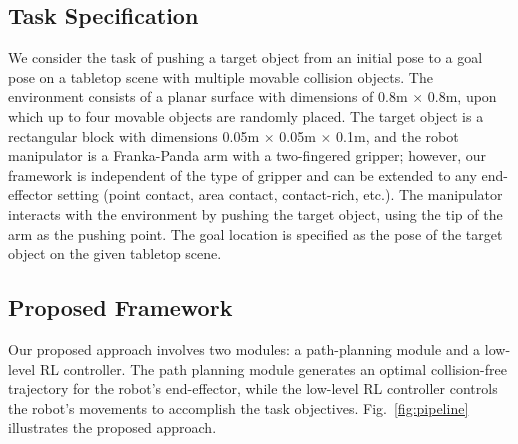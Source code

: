 \subsection{Task Specification}
\label{sec:task-specification}

We consider the task of pushing a target object from an initial pose to a goal pose on a tabletop scene with multiple movable collision objects. The environment consists of a planar surface with dimensions of 0.8m $\times$ 0.8m, upon which up to four movable objects are randomly placed. The target object is a rectangular block with dimensions 0.05m $\times$ 0.05m $\times$ 0.1m, and the robot manipulator is a Franka-Panda arm with a two-fingered gripper; however, our framework is independent of the type of gripper and can be extended to any end-effector setting (point contact, area contact, contact-rich, etc.). The manipulator interacts with the environment by pushing the target object, using the tip of the arm as the pushing point. The goal location is specified as the pose of the target object on the given tabletop scene. 

\subsection{Proposed Framework}

Our proposed approach involves two modules: a path-planning module and a low-level RL controller. The path planning module generates an optimal collision-free trajectory for the robot's end-effector, while the low-level RL controller controls the robot's movements to accomplish the task objectives. Fig.~\ref{fig:pipeline} illustrates the proposed approach.

